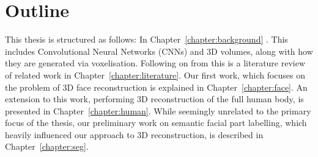 \section{Outline} This thesis is structured as follows: In
Chapter~\ref{chapter:background} . This includes Convolutional
Neural Networks (CNNs) and 3D volumes, along with how they are
generated via voxelisation. Following on from this is a literature
review of related work in Chapter~\ref{chapter:literature}. Our first
work, which focuses on the problem of 3D face reconstruction is
explained in Chapter~\ref{chapter:face}. An extension to this work,
performing 3D reconstruction of the full human body, is presented in
Chapter~\ref{chapter:human}. While seemingly unrelated to the primary
focus of the thesis, our preliminary work on semantic facial part
labelling, which heavily influenced our approach to 3D reconstruction,
is described in Chapter~\ref{chapter:seg}.





